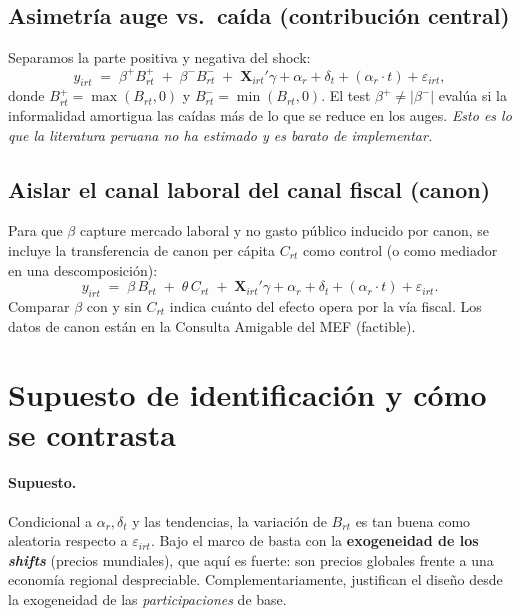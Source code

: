\documentclass[11pt]{article}
\begin{document}
\subsection{Asimetría auge vs.\ caída (contribución central)}
Separamos la parte positiva y negativa del shock:
\begin{equation}
y_{irt} \;=\; \beta^{+} B_{rt}^{+} \;+\; \beta^{-} B_{rt}^{-} \;+\;
\mathbf{X}_{irt}'\gamma + \alpha_r + \delta_t + (\alpha_r\cdot t) + \varepsilon_{irt},
\end{equation}
donde $B_{rt}^{+}=\max(B_{rt},0)$ y $B_{rt}^{-}=\min(B_{rt},0)$. El test $\beta^{+}\neq
|\beta^{-}|$ evalúa si la informalidad amortigua las caídas más de lo que se reduce en los
auges. \emph{Esto es lo que la literatura peruana no ha estimado y es barato de implementar.}

\subsection{Aislar el canal laboral del canal fiscal (canon)}
Para que $\beta$ capture mercado laboral y no gasto público inducido por canon, se incluye la
transferencia de canon per cápita $C_{rt}$ como control (o como mediador en una descomposición):
\begin{equation}
y_{irt} \;=\; \beta\, B_{rt} \;+\; \theta\, C_{rt} \;+\; \mathbf{X}_{irt}'\gamma
+ \alpha_r + \delta_t + (\alpha_r\cdot t) + \varepsilon_{irt}.
\end{equation}
Comparar $\beta$ con y sin $C_{rt}$ indica cuánto del efecto opera por la vía fiscal. Los
datos de canon están en la Consulta Amigable del MEF (factible).

\section{Supuesto de identificación y cómo se contrasta}

\paragraph{Supuesto.} Condicional a $\alpha_r,\delta_t$ y las tendencias, la variación de
$B_{rt}$ es tan buena como aleatoria respecto a $\varepsilon_{irt}$. Bajo el marco de
\citet{borusyak2022} basta con la \textbf{exogeneidad de los \textit{shifts}} (precios
mundiales), que aquí es fuerte: son precios globales frente a una economía regional
despreciable. Complementariamente, \citet{goldsmith2020} justifican el diseño desde la
exogeneidad de las \emph{participaciones} de base.
\end{document}
